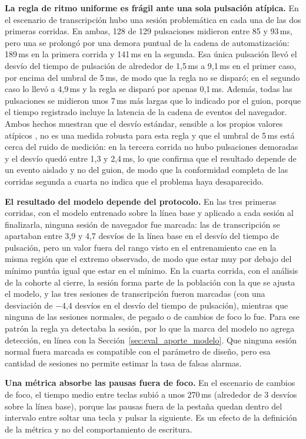 \textbf{La regla de ritmo uniforme es frágil ante una sola pulsación atípica.} En el escenario de transcripción hubo una sesión problemática en cada una de las dos primeras corridas. En ambas, 128 de 129 pulsaciones midieron entre 85 y 93\,ms, pero una se prolongó por una demora puntual de la cadena de automatización: 189\,ms en la primera corrida y 141\,ms en la segunda. Esa única pulsación llevó el desvío del tiempo de pulsación de alrededor de 1,5\,ms a 9,1\,ms en el primer caso, por encima del umbral de 5\,ms, de modo que la regla no se disparó; en el segundo caso lo llevó a 4,9\,ms y la regla se disparó por apenas 0,1\,ms. Además, todas las pulsaciones se midieron unos 7\,ms más largas que lo indicado por el guion, porque el tiempo registrado incluye la latencia de la cadena de eventos del navegador. Ambos hechos muestran que el desvío estándar, sensible a los propios valores atípicos \parencite{Leys2013}, no es una medida robusta para esta regla y que el umbral de 5\,ms está cerca del ruido de medición: en la tercera corrida no hubo pulsaciones demoradas y el desvío quedó entre 1,3 y 2,4\,ms, lo que confirma que el resultado depende de un evento aislado y no del guion, de modo que la conformidad completa de las corridas segunda a cuarta no indica que el problema haya desaparecido.

\textbf{El resultado del modelo depende del protocolo.} En las tres primeras corridas, con el modelo entrenado sobre la línea base y aplicado a cada sesión al finalizarla, ninguna sesión de navegador fue marcada: las de transcripción se apartaban entre 3,9 y 4,7 desvíos de la línea base en el desvío del tiempo de pulsación, pero un valor fuera del rango visto en el entrenamiento cae en la misma región que el extremo observado, de modo que estar muy por debajo del mínimo puntúa igual que estar en el mínimo. En la cuarta corrida, con el análisis de la cohorte al cierre, la sesión forma parte de la población con la que se ajusta el modelo, y las tres sesiones de transcripción fueron marcadas (con una desviación de $-$4,4 desvíos en el desvío del tiempo de pulsación), mientras que ninguna de las sesiones normales, de pegado o de cambios de foco lo fue. Para ese patrón la regla ya detectaba la sesión, por lo que la marca del modelo no agrega detección, en línea con la Sección~\ref{sec:eval_aporte_modelo}. Que ninguna sesión normal fuera marcada es compatible con el parámetro de diseño, pero esa cantidad de sesiones no permite estimar la tasa de falsas alarmas.

\textbf{Una métrica absorbe las pausas fuera de foco.} En el escenario de cambios de foco, el tiempo medio entre teclas subió a unos 270\,ms (alrededor de 3 desvíos sobre la línea base), porque las pausas fuera de la pestaña quedan dentro del intervalo entre soltar una tecla y pulsar la siguiente. Es un efecto de la definición de la métrica y no del comportamiento de escritura.


